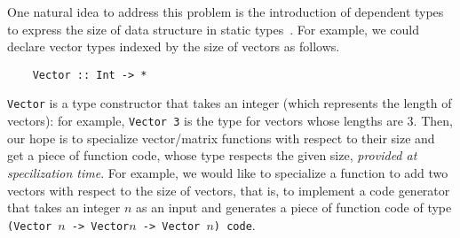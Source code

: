 
One natural idea to address this problem is the introduction of dependent types
to express the size of data structure in static types~\cite{Xi98}.
For example, we could declare vector types indexed by the size of
vectors as follows.
\begin{verbatim}
    Vector :: Int -> *
\end{verbatim}
\verb|Vector| is a type constructor that takes an integer (which
represents the length of vectors): for example, \verb|Vector 3| is the
type for vectors whose lengths are 3.  Then, our hope is to specialize
vector/matrix functions with respect to their size and get a piece of
function code, whose type respects the given size, \emph{provided at
  specilization time}.  For example, we would like to specialize a
function to add two vectors with respect to the size of vectors, that
is, to implement a code generator that takes an integer $n$ as an
input and generates a piece of function code of type
\verb|(Vector |$n$\verb| -> Vector|$n$\verb| -> Vector |$n$\verb|) code|.


